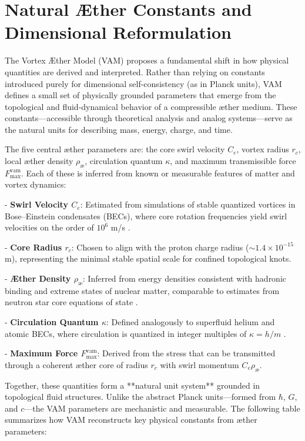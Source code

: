 \section{Natural Æther Constants and Dimensional Reformulation}

The Vortex Æther Model (VAM) proposes a fundamental shift in how physical quantities are derived and interpreted. Rather than relying on constants introduced purely for dimensional self-consistency (as in Planck units), VAM defines a small set of physically grounded parameters that emerge from the topological and fluid-dynamical behavior of a compressible æther medium. These constants—accessible through theoretical analysis and analog systems—serve as the natural units for describing mass, energy, charge, and time.

The five central æther parameters are: the core swirl velocity $C_e$, vortex radius $r_c$, local æther density $\rho_\text{\ae}$, circulation quantum $\kappa$, and maximum transmissible force $F_\text{max}^{\text{vam}}$. Each of these is inferred from known or measurable features of matter and vortex dynamics:

- \textbf{Swirl Velocity $C_e$}: Estimated from simulations of stable quantized vortices in Bose–Einstein condensates (BECs), where core rotation frequencies yield swirl velocities on the order of $10^6$ m/s \cite{Pethick2008BEC, Kleckner2013KnottedVortices}.

- \textbf{Core Radius $r_c$}: Chosen to align with the proton charge radius ($\sim 1.4 \times 10^{-15}$ m), representing the minimal stable spatial scale for confined topological knots.

- \textbf{Æther Density $\rho_\text{\ae}$}: Inferred from energy densities consistent with hadronic binding and extreme states of nuclear matter, comparable to estimates from neutron star core equations of state \cite{Lattimer2016EOS}.

- \textbf{Circulation Quantum $\kappa$}: Defined analogously to superfluid helium and atomic BECs, where circulation is quantized in integer multiples of $\kappa = h/m$ \cite{Donnelly1991QuantizedVortices}.

- \textbf{Maximum Force $F_\text{max}^{\text{vam}}$}: Derived from the stress that can be transmitted through a coherent æther core of radius $r_c$ with swirl momentum $C_e \rho_\text{\ae}$.

Together, these quantities form a **natural unit system** grounded in topological fluid structures. Unlike the abstract Planck units—formed from $\hbar$, $G$, and $c$—the VAM parameters are mechanistic and measurable. The following table summarizes how VAM reconstructs key physical constants from æther parameters:

